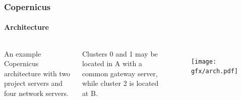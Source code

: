 \begin{frame}
\frametitle{Copernicus}
\framesubtitle{Architecture}

\begin{columns}
   An example Copernicus architecture with two
  project servers and four network servers.
  \vspace{10pt}

  \pause Clusters 0 and 1 may be located in A with a common gateway
  server, while cluster 2 is located at B.

  \begin{figure}
    \centering
    \texttt{[image: gfx/arch.pdf]}
  \end{figure}
\end{columns}

\end{frame}


